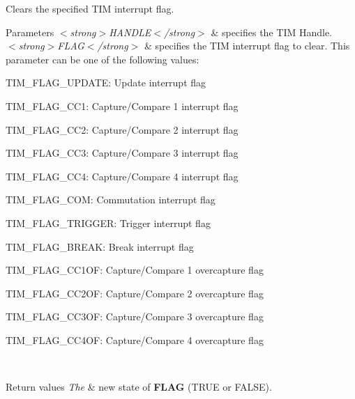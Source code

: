 Clears the specified T\+IM interrupt flag. 


\begin{DoxyParams}{Parameters}
{\em $<$strong$>$\+H\+A\+N\+D\+L\+E$<$/strong$>$} & specifies the T\+IM Handle. \\
\hline
{\em $<$strong$>$\+F\+L\+A\+G$<$/strong$>$} & specifies the T\+IM interrupt flag to clear. This parameter can be one of the following values\+: \begin{DoxyItemize}
\item T\+I\+M\+\_\+\+F\+L\+A\+G\+\_\+\+U\+P\+D\+A\+TE\+: Update interrupt flag \item T\+I\+M\+\_\+\+F\+L\+A\+G\+\_\+\+C\+C1\+: Capture/\+Compare 1 interrupt flag \item T\+I\+M\+\_\+\+F\+L\+A\+G\+\_\+\+C\+C2\+: Capture/\+Compare 2 interrupt flag \item T\+I\+M\+\_\+\+F\+L\+A\+G\+\_\+\+C\+C3\+: Capture/\+Compare 3 interrupt flag \item T\+I\+M\+\_\+\+F\+L\+A\+G\+\_\+\+C\+C4\+: Capture/\+Compare 4 interrupt flag \item T\+I\+M\+\_\+\+F\+L\+A\+G\+\_\+\+C\+OM\+: Commutation interrupt flag \item T\+I\+M\+\_\+\+F\+L\+A\+G\+\_\+\+T\+R\+I\+G\+G\+ER\+: Trigger interrupt flag \item T\+I\+M\+\_\+\+F\+L\+A\+G\+\_\+\+B\+R\+E\+AK\+: Break interrupt flag \item T\+I\+M\+\_\+\+F\+L\+A\+G\+\_\+\+C\+C1\+OF\+: Capture/\+Compare 1 overcapture flag \item T\+I\+M\+\_\+\+F\+L\+A\+G\+\_\+\+C\+C2\+OF\+: Capture/\+Compare 2 overcapture flag \item T\+I\+M\+\_\+\+F\+L\+A\+G\+\_\+\+C\+C3\+OF\+: Capture/\+Compare 3 overcapture flag \item T\+I\+M\+\_\+\+F\+L\+A\+G\+\_\+\+C\+C4\+OF\+: Capture/\+Compare 4 overcapture flag \end{DoxyItemize}
\\
\hline
\end{DoxyParams}

\begin{DoxyRetVals}{Return values}
{\em The} & new state of {\bfseries F\+L\+AG} (T\+R\+UE or F\+A\+L\+SE). \\
\hline
\end{DoxyRetVals}
\mbox{\label{group___t_i_m___exported___macros_gaea68155ce77e591e0c2582def061d6f0}} 
